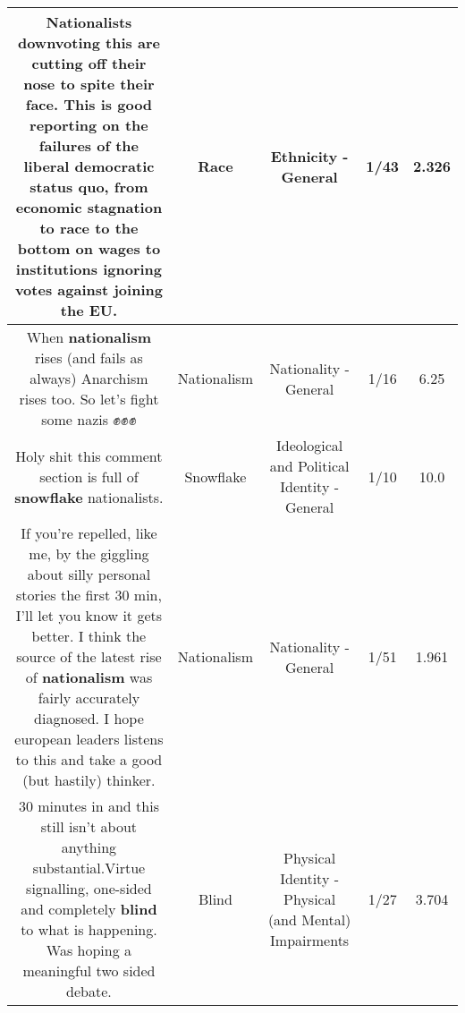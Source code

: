 \documentclass[11pt]{article}
\newlength\mylength
\begin{document}
\begin{center}
\begin{longtable}{|C{.65\mylength}|C{.30\mylength}|C{.12\mylength}|C{.12\mylength}|C{.12\mylength}|}
  \small Nationalists downvoting this are cutting off their nose to spite their face. This is good reporting on the failures of the liberal democratic status quo, from economic stagnation to \textbf{race} to the bottom on wages to institutions ignoring votes against joining the EU.\normalsize   & Race & Ethnicity - General & 1/43 & 2.326 \\  \hline
  \small When \textbf{nationalism} rises (and fails as always) Anarchism rises too. So let's fight some nazis ✊✊✊\normalsize   & Nationalism & Nationality - General & 1/16 & 6.25 \\  \hline
  \small Holy shit this comment section is full of \textbf{snowflake} nationalists.\normalsize   & Snowflake &  Ideological and Political Identity - General & 1/10 & 10.0 \\  \hline
  \small If you're repelled, like me, by the giggling about silly personal stories the first 30 min, I'll let you know it gets better. I think the source of the latest rise of \textbf{nationalism} was fairly accurately diagnosed. I hope european leaders listens to this and take a good (but hastily) thinker.\normalsize   & Nationalism & Nationality - General & 1/51 & 1.961 \\  \hline
  \small 30 minutes in and this still isn't about anything substantial.Virtue signalling, one-sided and completely \textbf{blind} to what is happening. Was hoping a meaningful two sided debate.\normalsize   & Blind & Physical Identity - Physical (and Mental) Impairments & 1/27 & 3.704 \\  \hline

\end{longtable}
\end{center}
\end{document}
